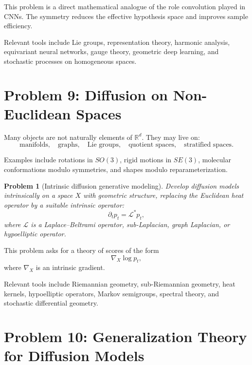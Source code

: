 \documentclass[11pt]{article}
\newtheorem{problem}{Problem}
\begin{document}
This problem is a direct mathematical analogue of the role convolution played in CNNs. The symmetry reduces the effective hypothesis space and improves sample efficiency.

Relevant tools include Lie groups, representation theory, harmonic analysis, equivariant neural networks, gauge theory, geometric deep learning, and stochastic processes on homogeneous spaces.

\section{Problem 9: Diffusion on Non-Euclidean Spaces}

Many objects are not naturally elements of $\mathbb{R}^d$. They may live on:
\begin{equation}
\text{manifolds}, \quad
\text{graphs}, \quad
\text{Lie groups}, \quad
\text{quotient spaces}, \quad
\text{stratified spaces}.
\end{equation}

Examples include rotations in $SO(3)$, rigid motions in $SE(3)$, molecular conformations modulo symmetries, and shapes modulo reparameterization.

\begin{problem}[Intrinsic diffusion generative modeling]
Develop diffusion models intrinsically on a space $X$ with geometric structure, replacing the Euclidean heat operator by a suitable intrinsic operator:
\begin{equation}
\partial_t p_t = \mathcal{L}^\ast p_t,
\end{equation}
where $\mathcal{L}$ is a Laplace--Beltrami operator, sub-Laplacian, graph Laplacian, or hypoelliptic operator.
\end{problem}

This problem asks for a theory of scores of the form
\begin{equation}
\nabla_X \log p_t,
\end{equation}
where $\nabla_X$ is an intrinsic gradient.

Relevant tools include Riemannian geometry, sub-Riemannian geometry, heat kernels, hypoelliptic operators, Markov semigroups, spectral theory, and stochastic differential geometry.

\section{Problem 10: Generalization Theory for Diffusion Models}
\end{document}
